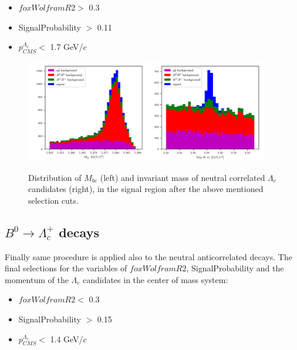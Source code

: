 \begin{itemize}
    \item $foxWolframR2  > $  0.3
    \item SignalProbability $>$ 0.11
    \item $p^{\Lambda_c}_{CMS} <$ 1.7 GeV/$c$
\end{itemize}
 

\begin{figure}[H]
{\includegraphics[width=0.95\textwidth]{03-Selection/figs/B0corr_Mbc_MpKpi_optmised.png}}
\caption{Distribution of $M_{bc} $ (left) and invariant mass of neutral correlated $\Lambda_c$  candidates (right), in the signal region after the above mentioned selection cuts.}
\label{fig:B0corr_Mbc_MpKpi_optmised}
\end{figure}



                               
\subsection{$B^0 \rightarrow \Lambda_c^+$ decays}
\label{sec:neutralAcorrBtoLambdaC}


Finally same procedure is applied also to the neutral anticorrelated decays. 
The final selections for the variables of  $foxWolframR2 $,  SignalProbability and the momentum of the $\Lambda_c$ candidates in the center of mass system:


\begin{itemize}
    \item $foxWolframR2  < $  0.3
    \item SignalProbability $>$ 0.15
    \item $p^{\Lambda_c}_{CMS} <$ 1.4 GeV/$c$
\end{itemize}    

